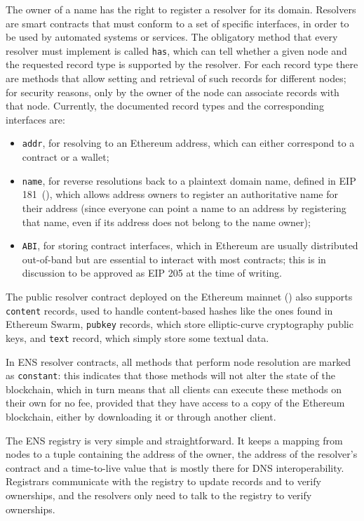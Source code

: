 \documentclass[mscthesis]{usiinfthesis}
\begin{document}
The owner of a name has the right to register a resolver for its domain. Resolvers are smart contracts that must conform to a set of specific interfaces, in order to be used by automated systems or services. The obligatory method that every resolver must implement is called \texttt{has}, which can tell whether a given node and the requested record type is supported by the resolver. For each record type there are methods that allow setting and retrieval of such records for different nodes; for security reasons, only by the owner of the node can associate records with that node. Currently, the documented record types and the corresponding interfaces are:
\begin{itemize}
	\item \texttt{addr}, for resolving to an Ethereum address, which can either correspond to a contract or a wallet;
	\item \texttt{name}, for reverse resolutions back to a plaintext domain name, defined in EIP 181~(\cite{eip:181}), which allows address owners to register an authoritative name for their address (since everyone can point a name to an address by registering that name, even if its address does not belong to the name owner);
	\item \texttt{ABI}, for storing contract interfaces, which in Ethereum are usually distributed out-of-band but are essential to interact with most contracts; this is in discussion to be approved as EIP 205 at the time of writing.
\end{itemize}

The public resolver contract deployed on the Ethereum mainnet (\cite{enspublicresolver}) also supports \texttt{content} records, used to handle content-based hashes like the ones found in Ethereum Swarm, \texttt{pubkey} records, which store elliptic-curve cryptography public keys, and \texttt{text} record, which simply store some textual data.

In ENS resolver contracts, all methods that perform node resolution are marked as \texttt{constant}: this indicates that those methods will not alter the state of the blockchain, which in turn means that all clients can execute these methods on their own for no fee, provided that they have access to a copy of the Ethereum blockchain, either by downloading it or through another client.

The ENS registry is very simple and straightforward. It keeps a mapping from nodes to a tuple containing the address of the owner, the address of the resolver's contract and a time-to-live value that is mostly there for DNS interoperability. Registrars communicate with the registry to update records and to verify ownerships, and the resolvers only need to talk to the registry to verify ownerships.
\end{document}
